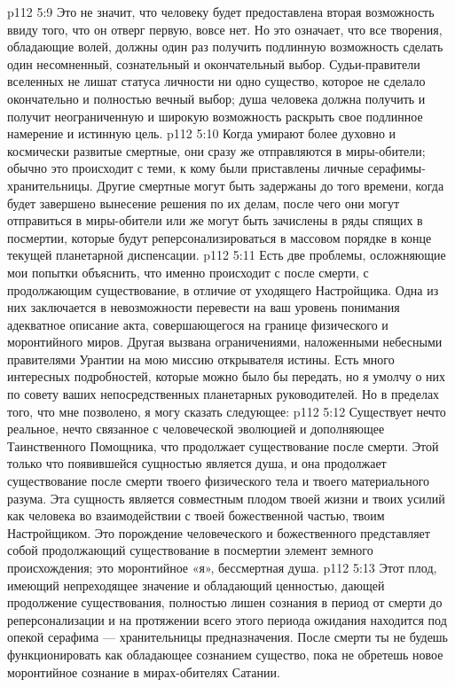 \vs p112 5:9 Это не значит, что человеку будет предоставлена вторая возможность ввиду того, что он отверг первую, вовсе нет. Но это означает, что все творения, обладающие волей, должны один раз получить подлинную возможность сделать один несомненный, сознательный и окончательный выбор. Судьи\hyp{}правители вселенных не лишат статуса личности ни одно существо, которое не сделало окончательно и полностью вечный выбор; душа человека должна получить и получит неограниченную и широкую возможность раскрыть свое подлинное намерение и истинную цель.
\vs p112 5:10 Когда умирают более духовно и космически развитые смертные, они сразу же отправляются в миры\hyp{}обители; обычно это происходит с теми, к кому были приставлены личные серафимы\hyp{}хранительницы. Другие смертные могут быть задержаны до того времени, когда будет завершено вынесение решения по их делам, после чего они могут отправиться в миры\hyp{}обители или же могут быть зачислены в ряды спящих в посмертии, которые будут реперсонализироваться в массовом порядке в конце текущей планетарной диспенсации.
\vs p112 5:11 \pc Есть две проблемы, осложняющие мои попытки объяснить, что именно происходит с  после смерти, с  продолжающим существование, в отличие от уходящего Настройщика. Одна из них заключается в невозможности перевести на ваш уровень понимания адекватное описание акта, совершающегося на границе физического и моронтийного миров. Другая вызвана ограничениями, наложенными небесными правителями Урантии на мою миссию открывателя истины. Есть много интересных подробностей, которые можно было бы передать, но я умолчу о них по совету ваших непосредственных планетарных руководителей. Но в пределах того, что мне позволено, я могу сказать следующее:
\vs p112 5:12 Существует нечто реальное, нечто связанное с человеческой эволюцией и дополняющее Таинственного Помощника, что продолжает существование после смерти. Этой только что появившейся сущностью является душа, и она продолжает существование после смерти твоего физического тела и твоего материального разума. Эта сущность является совместным плодом твоей жизни и твоих усилий как человека во взаимодействии с твоей божественной частью, твоим Настройщиком. Это порождение человеческого и божественного представляет собой продолжающий существование в посмертии элемент земного происхождения; это моронтийное «я», бессмертная душа.
\vs p112 5:13 Этот плод, имеющий непреходящее значение и обладающий ценностью, дающей продолжение существования, полностью лишен сознания в период от смерти до реперсонализации и на протяжении всего этого периода ожидания находится под опекой серафима --- хранительницы предназначения. После смерти ты не будешь функционировать как обладающее сознанием существо, пока не обретешь новое моронтийное сознание в мирах\hyp{}обителях Сатании.
